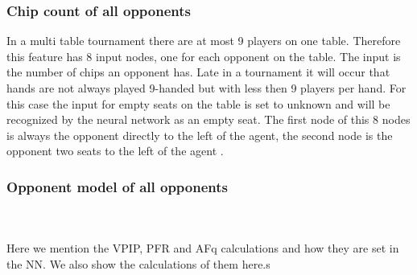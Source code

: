 \subsubsection{Chip count of all opponents}
In a  multi table tournament there are at most 9 players on one table. Therefore this feature has 8 input nodes, one for each opponent on the table. The input is the number of chips an opponent has. Late in a tournament it will occur that hands are not always played 9-handed but with less then 9 players per hand. For this case the input for empty seats on the table is set to unknown and will be recognized by the neural network as an empty seat. The first node of this 8 nodes is always the opponent directly to the left of the agent, the second node is the opponent two seats to the left of the agent \cite{evolutionary_methods}. 
\subsubsection{Opponent model of all opponents}
\\\\
Here we mention the VPIP, PFR and AFq calculations and how they are set in the NN. We also show the calculations of them here.s
